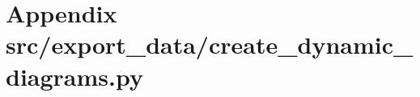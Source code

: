 \section{Appendix \/src/export\_data/create\_dynamic\_diagrams.py}\label{app:create_dynamic_diagrams.py}
